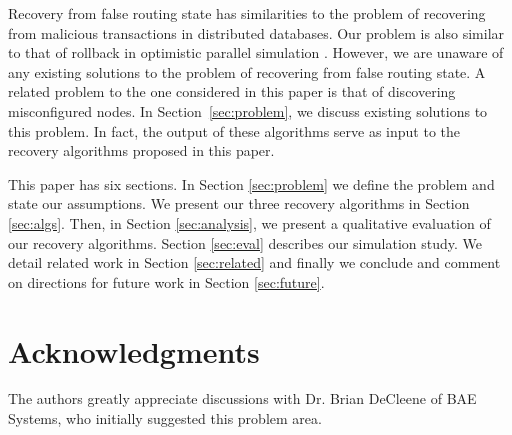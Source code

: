\documentclass[10pt,conference]{IEEEtran}
\begin{document}
Recovery from false routing state has similarities to the problem of
recovering from malicious transactions \cite{Liu98, Liu00} in
distributed databases. Our problem is also similar to that of rollback
in optimistic parallel simulation \cite{Jeff}. However, we are unaware
of any existing solutions to the problem of recovering from false
routing state. A related problem to the one considered in this
paper is that of discovering misconfigured nodes. In
Section~\ref{sec:problem}, we discuss existing solutions to this
problem. In fact, the output of these algorithms serve as input to the
recovery algorithms proposed in this paper.

This paper has six sections. In Section \ref{sec:problem} we define the problem and state our assumptions.
We present our three recovery algorithms in Section \ref{sec:algs}.  Then, in Section \ref{sec:analysis}, we present a qualitative evaluation 
of our recovery algorithms. Section \ref{sec:eval} describes our simulation study. We detail related work in Section \ref{sec:related} and finally we conclude and 
comment on directions for future work in Section \ref{sec:future}.





















\section{Acknowledgments}
The authors greatly appreciate discussions with Dr. Brian DeCleene of BAE Systems, who initially suggested this problem area.





%

%
\end{document}
